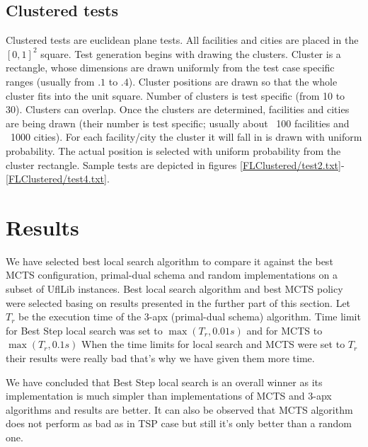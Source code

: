 \subsection{Clustered tests}
\FloatBarrier
Clustered tests are euclidean plane tests.
All facilities and cities are placed in the $[0,1]^2$ square.
Test generation begins with drawing the clusters.
Cluster is a rectangle, whose dimensions are drawn uniformly from the test case specific ranges (usually from $.1$ to $.4$).
Cluster positions are drawn so that the whole cluster fits into the unit square.
Number of clusters is test specific (from 10 to 30). Clusters can overlap.
Once the clusters are determined, facilities and cities are being drawn (their number is test specific; usually about ~100 facilities and ~1000 cities).
For each facility/city the cluster it will fall in is drawn with uniform probability.
The actual position is selected with uniform probability from the cluster rectangle.
Sample tests are depicted in figures \ref{FLClustered/test2.txt}-\ref{FLClustered/test4.txt}.




\FloatBarrier

\section{Results}

We have selected best local search algorithm to compare it against the best MCTS configuration,
primal-dual schema and random implementations on a subset of UflLib instances.
Best local search algorithm and best MCTS policy were selected basing on
results presented in the further part of this section.
Let $T_r$ be the execution time of the 3-apx (primal-dual schema) algorithm.
Time limit for Best Step local search was set to $\max(T_r, 0.01s)$ and for MCTS to $\max(T_r, 0.1s)$
When the time limits for local search and MCTS were set to $T_r$ their
results were really bad that's why we have given them more time.

\begin{figure}[ht]
  \centering
  
\end{figure}
\FloatBarrier

We have concluded that Best Step local search is an overall winner as
its implementation is much simpler than implementations of
MCTS and 3-apx algorithms and results are better.
It can also be observed that MCTS algorithm does not perform as bad as in TSP case
but still it's only better than a random one.


